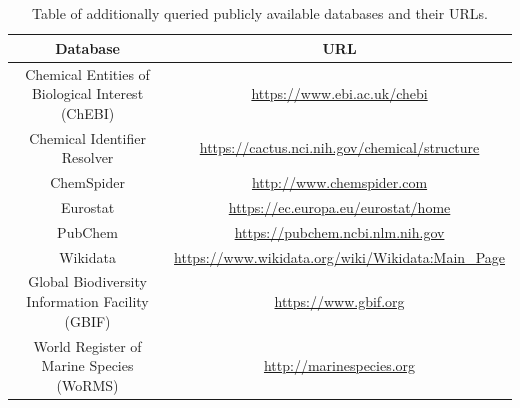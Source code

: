 \documentclass[journal,datadescriptor,submit,moreauthors,pdftex]{Definitions/mdpi}
\begin{document}
\section{}
\begin{table}[H]
    \caption{Table of additionally queried publicly available databases and their URLs.}
    \label{tab:data-base-additional}
    \centering
\begin{tabular}{cc}
    \toprule
    \textbf{Database} & \textbf{URL} \\ 
    \midrule
    \makecell{Chemical Entities of \\ Biological Interest (ChEBI)} & \url{https://www.ebi.ac.uk/chebi} \\
    Chemical Identifier Resolver & \url{https://cactus.nci.nih.gov/chemical/structure} \\[0.5cm]
    ChemSpider & \url{http://www.chemspider.com}    \\[0.5cm]
    Eurostat & \url{https://ec.europa.eu/eurostat/home} \\[0.5cm]
    PubChem & \url{https://pubchem.ncbi.nlm.nih.gov} \\[0.5cm]
    Wikidata & \url{https://www.wikidata.org/wiki/Wikidata:Main_Page} \\[0.5cm]
    \makecell{Global Biodiversity \\ Information Facility (GBIF)} & \url{https://www.gbif.org} \\[0.5cm]
    \makecell{World Register of \\ Marine Species (WoRMS)} & \url{http://marinespecies.org} \\
    \bottomrule
\end{tabular}
\end{table}
\end{document}

